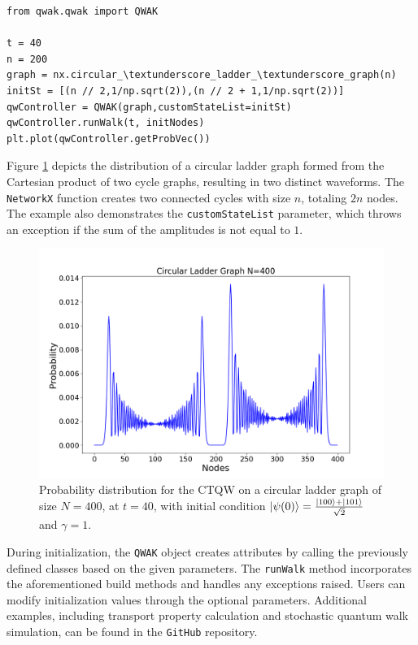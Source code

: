 \documentclass[main.tex]{subfiles}
\begin{document}
\begin{lstlisting}[style=code,escapeinside={__}]
from qwak.qwak import QWAK

t = 40
n = 200
graph = nx.circular_\textunderscore_ladder_\textunderscore_graph(n)
initSt = [(n // 2,1/np.sqrt(2)),(n // 2 + 1,1/np.sqrt(2))]
qwController = QWAK(graph,customStateList=initSt)
qwController.runWalk(t, initNodes)
plt.plot(qwController.getProbVec())
\end{lstlisting}

Figure \ref{fig:probDistCircLadder} depicts the distribution of a circular
ladder graph formed from the Cartesian product of two cycle graphs, resulting
in two distinct waveforms. The \texttt{NetworkX} function creates two connected
cycles with size $n$, totaling $2n$ nodes. The example also demonstrates the
\texttt{customStateList} parameter, which throws an exception if the sum of the
amplitudes is not equal to $1$.\par

\begin{figure}[!h]
\centering
\includegraphics[scale=\mysinglefigurescale]{circularLadderDynamics_N400_TMAX40.png}
\caption{Probability distribution for the CTQW on a
circular ladder graph of size $N=400$, at $t=40$, with initial condition
$\ket{\psi(0)}=\frac{\ket{100}+\ket{101}}{\sqrt{2}}$ and $\gamma=1$.}
\label{fig:probDistCircLadder}
\end{figure}

During initialization, the \texttt{QWAK} object creates attributes by calling
the previously defined classes based on the given parameters. The
\texttt{runWalk} method incorporates the aforementioned build methods and
handles any exceptions raised. Users can modify initialization values through
the optional parameters. Additional examples, including transport property
calculation and stochastic quantum walk simulation, can be found in the
\texttt{GitHub} repository.
\end{document}
